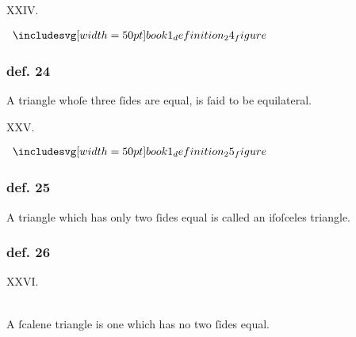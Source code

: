 \begin{center}
    XXIV.\label{book1def24}\\
\end{center}
\begin{minipage}{0.33\textwidth}
    \begin{center}
        $\img[0][0][50]{book1_definition_24_figure}$
    \end{center}
\end{minipage}%
\begin{minipage}{0.67\textwidth}
    \subsubsection{def. 24}
    \begin{center}
        \raggedright A triangle whoſe three ſides are equal, is ſaid to be equilateral.
    \end{center}
\end{minipage}

\hfill

\begin{center}
    XXV.\label{book1def25}\\
\end{center}
\begin{minipage}{0.33\textwidth}
    \begin{center}
        $\img[0][0][50]{book1_definition_25_figure}$
    \end{center}
\end{minipage}%
\begin{minipage}{0.67\textwidth}
    \subsubsection{def. 25}
    \begin{center}
        \raggedright A triangle which has only two ſides equal is called an iſoſceles triangle.
    \end{center}
\end{minipage}

\hfill

\begin{minipage}{0.1\textwidth}
    \phantom{}
\end{minipage}%
\begin{minipage}{0.8\textwidth}
    \subsubsection{def. 26}
    \begin{center}
        XXVI.\label{book1def26}\\
        \hfill\\
        \raggedright A ſcalene triangle is one which has no two ſides equal.\\
    \end{center}
\end{minipage}%
\begin{minipage}{0.1\textwidth}
    \phantom{}
\end{minipage}%

